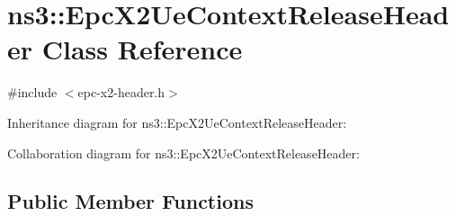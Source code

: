 \hypertarget{classns3_1_1EpcX2UeContextReleaseHeader}{}\section{ns3\+:\+:Epc\+X2\+Ue\+Context\+Release\+Header Class Reference}
\label{classns3_1_1EpcX2UeContextReleaseHeader}


{\ttfamily \#include $<$epc-\/x2-\/header.\+h$>$}



Inheritance diagram for ns3\+:\+:Epc\+X2\+Ue\+Context\+Release\+Header\+:


Collaboration diagram for ns3\+:\+:Epc\+X2\+Ue\+Context\+Release\+Header\+:
\subsection*{Public Member Functions}

